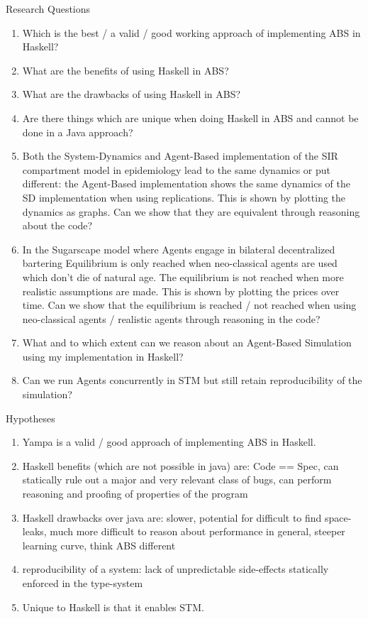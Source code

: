 Research Questions
\begin{enumerate}
	\item Which is the best / a valid / good working approach of implementing ABS in Haskell?
	\item What are the benefits of using Haskell in ABS?
	\item What are the drawbacks of using Haskell in ABS?
	\item Are there things which are unique when doing Haskell in ABS and cannot be done in a Java approach?
	\item Both the System-Dynamics and Agent-Based implementation of the SIR compartment model in epidemiology lead to the same dynamics or put different: the Agent-Based implementation shows the same dynamics of the SD implementation when using replications. This is shown by plotting the dynamics as graphs. Can we show that they are equivalent through reasoning about the code?
	\item In the Sugarscape model where Agents engage in bilateral decentralized bartering Equilibrium is only reached when neo-classical agents are used which don't die of natural age. The equilibrium is not reached when more realistic assumptions are made. This is shown by plotting the prices over time. Can we show that the equilibrium is reached / not reached when using neo-classical agents / realistic agents through reasoning in the code?
	\item What and to which extent can we reason about an Agent-Based Simulation using my implementation in Haskell?
	\item Can we run Agents concurrently in STM but still retain reproducibility of the simulation?
\end{enumerate}

Hypotheses
\begin{enumerate}
	\item Yampa is a valid / good approach of implementing ABS in Haskell.
	\item Haskell benefits (which are not possible in java) are: Code == Spec, can statically rule out a major and very relevant class of bugs, can perform reasoning and proofing of properties of the program
	\item Haskell drawbacks over java are: slower, potential for difficult to find space-leaks, much more difficult to reason about performance in general, steeper learning curve, think ABS different 
	\item reproducibility of a system: lack of unpredictable side-effects statically enforced in the type-system
	\item Unique to Haskell is that it enables STM.
\end{enumerate}

